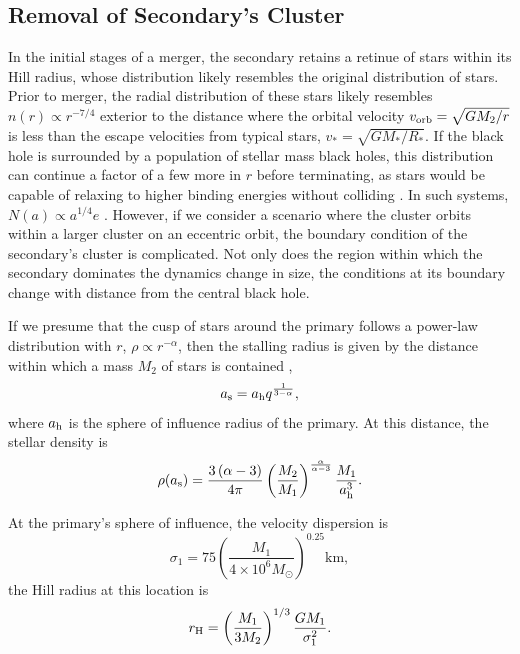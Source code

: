 \documentclass[a4paper,twocolumn]{emulateapj}
\begin{document}
\subsection{Removal of Secondary's Cluster}
In the initial stages of a merger, the secondary retains a retinue of stars within its Hill radius, whose distribution likely resembles the original distribution of stars. Prior to merger, the radial distribution of these stars likely resembles $n(r) \propto r^{-7/4}$ \citep{Bahcall:1976a} exterior to the distance where the orbital velocity $v_{\rm orb} = \sqrt{G M_{2} / r}$ is less than the escape velocities from typical stars, $v_{\ast} = \sqrt{G M_{\ast} / R_{\ast}}$. If the black hole is surrounded by a population of stellar mass black holes, this distribution can continue a factor of a few more in $r$ before terminating, as stars would be capable of relaxing to higher binding energies without colliding \citep{OLeary:2008a}. In such systems, $N(a) \propto a^{1/4} e$ \citep{Merritt:2013a}. However, if we consider a scenario where the cluster orbits within a larger cluster on an eccentric orbit, the boundary condition of the secondary's cluster is complicated. Not only does the region within which the secondary dominates the dynamics change in size, the conditions at its boundary change with distance from the central black hole.

If we presume that the cusp of stars around the primary follows a power-law distribution with $r$, $\rho \propto r^{-\alpha}$, then the stalling radius is given by the distance within which a mass $M_{2}$ of stars is contained ,
\begin{equation}
a_{\rm s} = a_{\rm h} q^{\frac{1}{3-\alpha}},
\label{eq:astall}
\end{equation}
where $a_{\rm h}$ is the sphere of influence radius of the primary. At this distance, the stellar density is
\begin{equation}
\rho(a_{\rm s}) = \frac{3 \left(\alpha - 3\right)}{4 \pi} \left(\frac{M_{2}}{M_{1}}\right)^{\frac{\alpha}{\alpha - 3}} \frac{M_{1}}{a_{\rm h}^{3}}.
\label{eq:rhostall}
\end{equation}

At the primary's sphere of influence, the velocity dispersion is
\begin{equation}
\sigma_{1} = 75 \left(\frac{M_{1}}{4 \times 10^{6} M_{\odot}}\right)^{0.25} \textrm{km}\label{eq:sigma},
\end{equation}
the Hill radius at this location is
\begin{equation}
r_{\rm H} = \left(\frac{M_{1}}{3 M_{2}}\right)^{1/3} \frac{G M_{1}}{\sigma_{1}^{2}}.
\end{equation}
\end{document}
